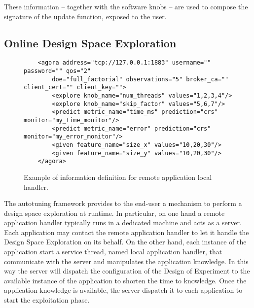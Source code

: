 These information -- together with the software knobs --  are used to compose the signature of the update function, exposed to the user.



\subsection{Online Design Space Exploration}


\begin{figure}
	\lstset{language=XML}
	\begin{lstlisting}
	<agora address="tcp://127.0.0.1:1883" username="" password="" qos="2"
        doe="full_factorial" observations="5" broker_ca="" client_cert="" client_key="">
		<explore knob_name="num_threads" values="1,2,3,4"/>
		<explore knob_name="skip_factor" values="5,6,7"/>
		<predict metric_name="time_ms" prediction="crs" monitor="my_time_monitor"/>
		<predict metric_name="error" prediction="crs" monitor="my_error_monitor"/>
		<given feature_name="size_x" values="10,20,30"/>
		<given feature_name="size_y" values="10,20,30"/>
	</agora>
	\end{lstlisting}
	\caption{Example of information definition for remote application local handler.}
	\label{code:agora_xml}
\end{figure}

The autotuning framework provides to the end-user a mechanism to perform a design space exploration at runtime.
In particular, on one hand a remote application handler typically runs in a dedicated machine and acts as a server.
Each application may contact the remote application handler to let it handle the Design Space Exploration on its behalf.
On the other hand, each instance of the application start a service thread, named local application handler, that communicate with the server and manipulates the application knowledge.
In this way the server will dispatch the configuration of the Design of Experiment to the available instance of the application to shorten the time to knowledge.
Once the application knowledge is available, the server dispatch it to each application to start the exploitation phase.

